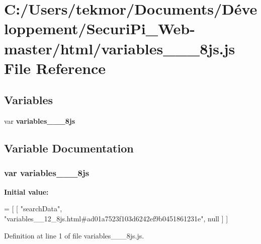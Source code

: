 \section{C\+:/\+Users/tekmor/\+Documents/\+Développement/\+Securi\+Pi\+\_\+\+Web-\/master/html/variables\+\_\+\+\_\+\_\+8js.js File Reference}
\label{variables____12__8js_8js}
\subsection*{Variables}
\begin{DoxyCompactItemize}
\item 
var {\bf variables\+\_\+\+\_\+\_\+8js}
\end{DoxyCompactItemize}


\subsection{Variable Documentation}
\subsubsection[{variables\+\_\+\+\_\+12\+\_\+8js}]{\setlength{\rightskip}{0pt plus 5cm}var variables\+\_\+\+\_\+\_\+8js}\label{variables____12__8js_8js_a3deda44c2b7cce75ce5776a34b93d453}
{\bfseries Initial value\+:}
\begin{DoxyCode}
=
[
    [ \textcolor{stringliteral}{"searchData"}, \textcolor{stringliteral}{"variables\_\_12\_8js.html#ad01a7523f103d6242ef9b0451861231e"}, null ]
]
\end{DoxyCode}


Definition at line 1 of file variables\+\_\+\+\_\+\_\+8js.\+js.

